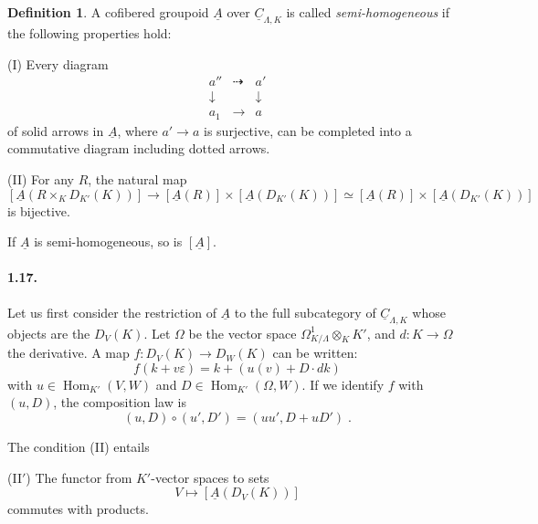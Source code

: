 \documentclass[11pt]{article}
\theoremstyle{plain}
\theoremstyle{definition}
\newtheorem{definition}[theorem]{Definition}
\theoremstyle{remark}
\DeclareMathOperator{\Hom}{Hom}
\newcommand{\uA}{\underline{A}}\newcommand{\uH}{\underline{H}}\newcommand{\uExt}{\underline{\operatorname{Ext}}}\newcommand{\uL}{\underline{L}}\newcommand{\uM}{\underline{M}}\newcommand{\uZ}{\underline{Z}}\newcommand{\uB}{\underline{B}}\newcommand{\uC}{\underline{C}}\newcommand{\uD}{\underline{D}}\newcommand{\uE}{\underline{E}}\newcommand{\uG}{\underline{G}}\newcommand{\uP}{\underline{P}}\newcommand{\uQ}{\underline{Q}}
\begin{document}
\begin{definition}
A cofibered groupoid $\uA$ over $\underline{C}_{\Lambda,K}$ is called \emph{semi-homogeneous} if the following properties hold:

\textup{(I)} Every diagram
\[
\begin{array}{ccc}
a'' & \dashrightarrow & a' \\
\downarrow & & \downarrow \\
a_1 & \longrightarrow & a
\end{array}
\]
of solid arrows in $\uA$, where $a' \longrightarrow a$ is surjective, can be completed into a commutative diagram including dotted arrows.

\textup{(II)} For any $R$, the natural map
\[
[\uA(R \times_K D_{K'}(K))] \longrightarrow [\uA(R)] \times [\uA(D_{K'}(K))] \simeq [\uA(R)] \times [\uA(D_{K'}(K))]
\]
is bijective.
\end{definition}

If $\uA$ is semi-homogeneous, so is $[\uA]$.

\paragraph{1.17.} Let us first consider the restriction of $\uA$ to the full subcategory of $\underline{C}_{\Lambda,K}$ whose objects are the $D_V(K)$. Let $\Omega$ be the vector space $\Omega^1_{K/\Lambda} \otimes_K K'$, and $d : K \to \Omega$ the derivative. A map $f : D_V(K) \to D_W(K)$ can be written:
\[
f(k + v\varepsilon) = k + (u(v) + D \cdot dk)
\]
with $u \in \Hom_{K'}(V,W)$ and $D \in \Hom_{K'}(\Omega, W)$. If we identify $f$ with $(u,D)$, the composition law is
\[
(u,D) \circ (u', D') = (uu', D + uD')\;.
\]

The condition \textup{(II)} entails

\textup{(II$'$)} The functor from $K'$-vector spaces to sets
\[
V \longmapsto [\uA(D_V(K))]
\]
commutes with products.
\end{document}
